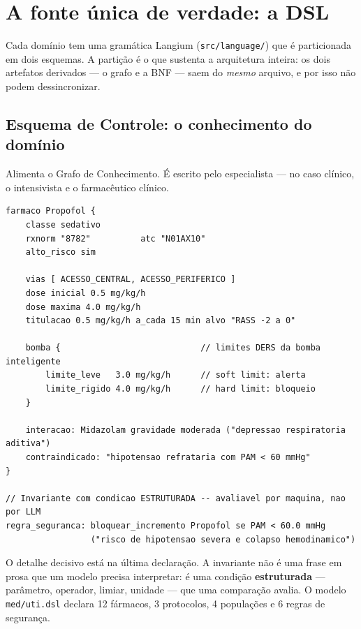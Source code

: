 \documentclass[11pt,a4paper]{article}
\newcommand{\arq}[1]{\texttt{\small #1}}
\begin{document}
\section{A fonte única de verdade: a DSL}

Cada domínio tem uma gramática Langium (\arq{src/language/}) que é particionada
em dois esquemas. A partição é o que sustenta a arquitetura inteira: os dois
artefatos derivados --- o grafo e a BNF --- saem do \emph{mesmo} arquivo, e por
isso não podem dessincronizar.

\subsection{Esquema de Controle: o conhecimento do domínio}

Alimenta o Grafo de Conhecimento. É escrito pelo especialista --- no caso
clínico, o intensivista e o farmacêutico clínico.

\begin{lstlisting}[language=dsl]
farmaco Propofol {
    classe sedativo
    rxnorm "8782"          atc "N01AX10"
    alto_risco sim

    vias [ ACESSO_CENTRAL, ACESSO_PERIFERICO ]
    dose inicial 0.5 mg/kg/h
    dose maxima 4.0 mg/kg/h
    titulacao 0.5 mg/kg/h a_cada 15 min alvo "RASS -2 a 0"

    bomba {                            // limites DERS da bomba inteligente
        limite_leve   3.0 mg/kg/h      // soft limit: alerta
        limite_rigido 4.0 mg/kg/h      // hard limit: bloqueio
    }

    interacao: Midazolam gravidade moderada ("depressao respiratoria aditiva")
    contraindicado: "hipotensao refrataria com PAM < 60 mmHg"
}

// Invariante com condicao ESTRUTURADA -- avaliavel por maquina, nao por LLM
regra_seguranca: bloquear_incremento Propofol se PAM < 60.0 mmHg
                 ("risco de hipotensao severa e colapso hemodinamico")
\end{lstlisting}

O detalhe decisivo está na última declaração. A invariante não é uma frase em
prosa que um modelo precisa interpretar: é uma condição \textbf{estruturada}
--- parâmetro, operador, limiar, unidade --- que uma comparação avalia. O modelo
\arq{med/uti.dsl} declara 12 fármacos, 3 protocolos, 4 populações e 6 regras de
segurança.
\end{document}
